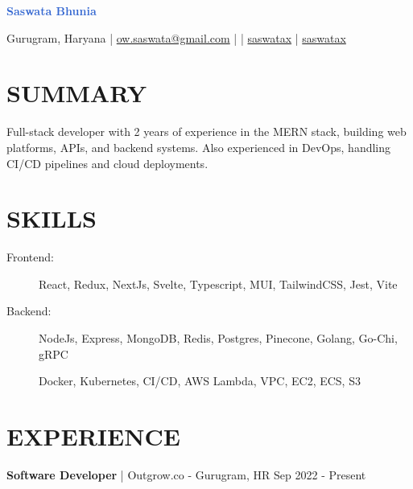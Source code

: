 \documentclass[]{resume}
\begin{document}
\textrm{\Huge\textcolor{highlight}{\textbf{Saswata Bhunia}}}
\vspace{.4em}

Gurugram, Haryana | \href{mailto:ow.saswata@gmail.com}{\faEnvelope \space ow.saswata@gmail.com} | \faPhone {} | \href{https://www.linkedin.com/in/saswatax}{\faLinkedin \space saswatax} | \href{https://github.com/saswatax}{\faGithub \space saswatax}
\vspace{.4em}

\section{SUMMARY}
Full-stack developer with 2 years of experience in the MERN stack, building web platforms, APIs, and backend systems. Also experienced in DevOps, handling CI/CD pipelines and cloud deployments.

\section{SKILLS}
\begin{description}
  \item[Frontend:] React, Redux, NextJs, Svelte, Typescript, MUI, TailwindCSS, Jest, Vite
  \item[Backend:] NodeJs, Express, MongoDB, Redis, Postgres, Pinecone, Golang, Go-Chi, gRPC
  \item[] Docker, Kubernetes, CI/CD, AWS Lambda, VPC, EC2, ECS, S3
\end{description}

\section{EXPERIENCE}
\textbf{Software Developer} | Outgrow.co - Gurugram, HR \hfill Sep 2022 - Present
\end{document}
